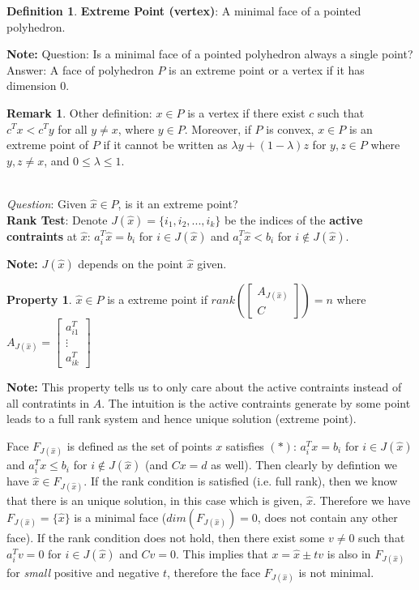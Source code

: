 \documentclass[10pt]{article}
\theoremstyle{definition}
\newtheorem{defn}{Definition}[section]
\newtheorem{pty}{Property}[section]
\newtheorem{remark}{Remark}[section]
\newcommand{\Note}[0]{\noindent\textbf{Note: }}
\begin{document}
\begin{defn} \textbf{Extreme Point (vertex)}:
	A minimal face of a pointed polyhedron.
\end{defn}

\Note Question: Is a minimal face of a pointed polyhedron always a single point?
Answer: A face of polyhedron $P$ is an extreme point or a vertex if it has dimension $0$.

\begin{remark}
	Other definition: $x \in P$ is a vertex if there exist $c$ such that $c^Tx < c^Ty$ for all $y \neq x$, where $y\in P$.
	Moreover, if $P$ is convex, $x \in P$ is an extreme point of $P$ if it cannot be written as $\lambda y + (1-\lambda)z$
	for $y, z \in P$ where $y, z \neq x$, and $0 \le \lambda \le 1$.
\end{remark}

\text{}\\
\textit{Question}: Given $\hat{x} \in P$, is it an extreme point?\\
\textbf{Rank Test}: Denote $J(\hat{x}) = \{i_1, i_2, ..., i_k\}$ be the indices of the \textbf{active contraints} at $\hat{x}$:
$a_{i}^T\hat{x} = b_{i}$ for $i \in J(\hat{x})$ and $a_{i}^T\hat{x} < b_{i}$ for $i \not\in J(\hat{x})$.

\Note $J(\hat{x})$ depends on the point $\hat{x}$ given.

\begin{pty}
	$\hat{x} \in P$ is a extreme point if $rank(\begin{bmatrix} A_{J(\hat{x})} \\ C \end{bmatrix}) = n$
	where $A_{J(\hat{x})}= \begin{bmatrix} a_{i1}^T \\ \vdots \\ a_{ik}^T \end{bmatrix}$
\end{pty}

\Note This property tells us to only care about the active contraints instead of all contratints in $A$.
The intuition is the active contraints generate by some point leads to a full rank system and hence unique solution (extreme point).

\proof Face $F_{J(\hat{x})}$ is defined as the set of points $x$ satisfies $(*)$:
$a_{i}^Tx = b_{i}$ for $i \in J(\hat{x})$ and $a_{i}^Tx \le b_{i}$ for $i \not\in J(\hat{x})$ (and $Cx = d$ as well).
Then clearly by defintion we have $\hat{x} \in F_{J(\hat{x})}$. If the rank condition is satisfied (i.e. full rank),
then we know that there is an unique solution, in this case which is given, $\hat{x}$.
Therefore we have $F_{J(\hat{x})} = \{\hat{x}\}$ is a minimal face ($dim(F_{J(\hat{x})}) = 0$, does not contain any other face).
If the rank condition does not hold, then there exist some $v \neq 0$ such that $a_{i}^Tv = 0$ for $i \in J(\hat{x})$ and $Cv = 0$.
This implies that $x = \hat{x} \pm tv$ is also in $F_{J(\hat{x})}$ for \textit{small} positive and negative $t$,
therefore the face $F_{J(\hat{x})}$ is not minimal.
\qedhere
\end{document}
